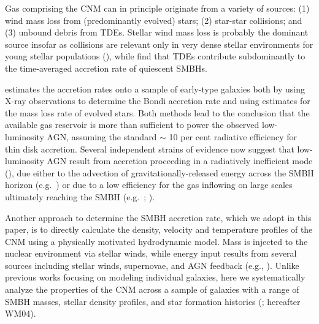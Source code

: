 \documentclass[usenatbib,fleqn]{mn2e}
\begin{document}
Gas comprising the CNM can in principle originate from a variety of sources: (1) wind mass loss from (predominantly evolved) stars; (2) star-star collisions; and (3) unbound debris from TDEs.  Stellar wind mass loss is probably the dominant source insofar as collisions are relevant only in very dense stellar environments for young stellar populations (\citealt{Rubin&Loeb11}), while \citet{MacLeod+13} find that TDEs contribute subdominantly to the time-averaged accretion rate of quiescent SMBHs.

\citet{Ho:2009a} estimates the accretion rates onto a sample of early-type galaxies both by using X-ray observations to determine the Bondi accretion rate and using estimates for the mass loss rate of evolved stars.  Both methods lead to the conclusion that the available gas reservoir is more than sufficient to power the observed low-luminosity AGN, assuming the standard $\sim$ 10 per cent radiative efficiency for thin disk accretion.  Several independent strains of evidence now suggest that low-luminosity AGN result from accretion proceeding in a radiatively inefficient mode (\citealt{Yuan&Narayan14}), due either to the advection of gravitationally-released energy across the SMBH horizon (e.g.~\citealt{Narayan&Yi95}) or due to a low efficiency for the gas inflowing on large scales ultimately reaching the SMBH (e.g.~\citealt{Blandford&Begelman99}; \citealt{Li+13}).


Another approach to determine the SMBH accretion rate, which we adopt in this paper, is to directly calculate the density, velocity and temperature profiles of the CNM using a physically motivated
hydrodynamic model.  Mass is injected to the nuclear environment via
stellar winds, while energy input results from several sources including stellar winds, supernovae, and AGN feedback (e.g., \citealt{Quataert:2004a,De-ColleGuillochon+:2012a,ShcherbakovWong+:2014a}).  Unlike previous works focusing on modeling individual galaxies, here we systematically analyze the properties of the CNM across a sample of galaxies with a range of SMBH masses, stellar density profiles, and star formation histories (\citealt{WangMerritt:2004a};
hereafter WM04).  
\end{document}
